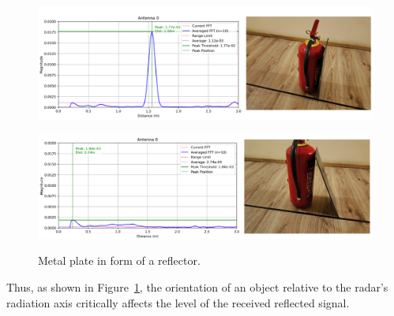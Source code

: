 \begin{figure}[H]
    \centering
    \begin{minipage}[b]{0.95\linewidth}
        \centering
            \includegraphics[width=1\linewidth]{Src//images/ognfft.png}

        \label{fig:object-position-a}
    \end{minipage}
    \hfill
    \begin{minipage}[b]{0.95\linewidth}
        \centering
            \includegraphics[width=1\linewidth]{Src//images/ognfft2.png}

        \label{fig:object-position-b}
    \end{minipage}
    \caption{Metal plate in form of a reflector.}
    \label{fig:object-position-comparison}
\end{figure}

Thus, as shown in Figure~\ref{fig:object-position-comparison}, the orientation of an object relative to the radar's radiation axis critically affects the level of the received reflected signal.



